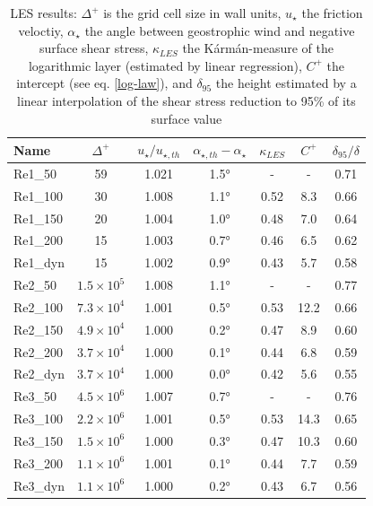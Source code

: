 \documentclass[a4paper,11pt]{article}
\begin{document}
\begin{table}
	\centering
	\caption{LES results: $\Delta^+$ is the grid cell size in wall units, $u_\star$ the friction veloctiy, $\alpha_\star$ the angle between geostrophic wind and negative surface shear stress, $\kappa_{LES}$ the Kármán-measure of the logarithmic layer (estimated by linear regression), $C^+$ the intercept (see eq. \ref{log-law}), and $\delta_{95}$ the height estimated by a linear interpolation of the shear stress reduction to 95\% of its surface value}
		\begin{tabular}{lcccccc}
		  Name & $\Delta^+$ & $u_\star/u_{\star,th}$ & $\alpha_{\star,th}-\alpha_\star$ & $\kappa_{LES}$ & $C^+$ & $\delta_{95}/\delta$ \\
			\hline
Re1\_50	&	59	&	1.021	&	1.5°	&	-	&	-	&	0.71	\\
Re1\_100	&	30	&	1.008	&	1.1°	&	0.52	&	8.3	&	0.66	\\
Re1\_150	&	20	&	1.004	&	1.0°	&	0.48	&	7.0	&	0.64	\\
Re1\_200	&	15	&	1.003	&	0.7°	&	0.46	&	6.5	&	0.62	\\
Re1\_dyn	&	15	&	1.002	&	0.9°	&	0.43	&	5.7	&	0.58	\\
\hline													
Re2\_50	&	$1.5\times10^5$	&	1.008	&	1.1°	&	-	&	-	&	0.77	\\
Re2\_100	&	$7.3\times10^4$	&	1.001	&	0.5°	&	0.53	&	12.2	&	0.66	\\
Re2\_150	&	$4.9\times10^4$	&	1.000	&	0.2°	&	0.47	&	8.9	&	0.60	\\
Re2\_200	&	$3.7\times10^4$	&	1.000	&	0.1°	&	0.44	&	6.8	&	0.59	\\
Re2\_dyn	&	$3.7\times10^4$	&	1.000	&	0.0°	&	0.42	&	5.6	&	0.55	\\
\hline													
Re3\_50	&	$4.5\times10^6$	&	1.007	&	0.7°	&	-	&	-	&	0.76	\\
Re3\_100	&	$2.2\times10^6$	&	1.001	&	0.5°	&	0.53	&	14.3	&	0.65	\\
Re3\_150	&	$1.5\times10^6$	&	1.000	&	0.3°	&	0.47	&	10.3	&	0.60	\\
Re3\_200	&	$1.1\times10^6$	&	1.001	&	0.1°	&	0.44	&	7.7	&	0.59	\\
Re3\_dyn	&	$1.1\times10^6$	&	1.000	&	0.2°	&	0.43	&	6.7	&	0.56	\\
			\hline
		\end{tabular}
	\label{simulation_results}
\end{table}
\end{document}
